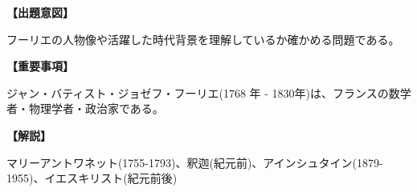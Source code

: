 \noindent \textbf{【出題意図】}

\noindent フーリエの人物像や活躍した時代背景を理解しているか確かめる問題である。

\vspace{1em}
\noindent \textbf{【重要事項】}

ジャン・バティスト・ジョゼフ・フーリエ(1768 年 - 1830年)は、フランスの数学者・物理学者・政治家である。

\vspace{1em}
\noindent \textbf{【解説】}

\noindent マリーアントワネット(1755-1793)、釈迦(紀元前)、アインシュタイン(1879-1955)、イエスキリスト(紀元前後)
